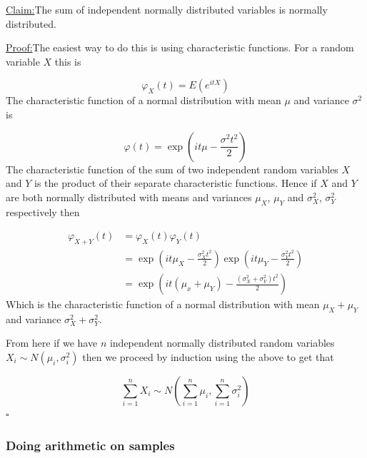 \documentclass[a4paper]{article}
\renewcommand{\qed}{\hfill\ensuremath{\square}}
\newenvironment{claim}[1]{\par\noindent\underline{Claim:}\space#1}{}
\newenvironment{claimproof}[1]{\par\noindent\underline{Proof:}\space#1}{\qed}
\begin{document}
\begin{mdframed}
	\begin{claim}
		The sum of independent normally distributed variables is normally distributed.
	\end{claim}
	\begin{claimproof}
		The easiest way to do this is using characteristic functions. For a random variable \(X\) this is

		\[\varphi_X(t) = E(e^{itX})\]
		The characteristic function of a normal distribution with mean \(\mu\) and variance \(\sigma^2\) is

		\[\varphi(t) = \exp(i t \mu - \frac{\sigma^2 t^2}{2})\]
		The characteristic function of the sum of two independent random variables \(X\) and \(Y\) is the product of their separate characteristic functions. Hence if \(X\) and \(Y\) are both normally distributed with means and variances \(\mu_X\), \(\mu_Y\) and \(\sigma_X^2\), \(\sigma_Y^2\) respectively then

		\begin{align*}
			\varphi_{X+Y}(t)
			& = \varphi_X(t) \varphi_Y(t) \\
			& = \exp\left(i t \mu_X - \frac{\sigma_X^2 t^2}{2}\right) \exp\left(i t \mu_Y - \frac{\sigma_Y^2 t^2}{2}\right) \\
			& = \exp\left(i t (\mu_x + \mu_Y) - \frac{(\sigma_X^2 + \sigma_Y^2) t^2}{2}\right)
		\end{align*}
		Which is the characteristic function of a normal distribution with mean \(\mu_X + \mu_Y\) and variance \(\sigma_X^2 + \sigma_Y^2\).

		From here if we have \(n\) independent normally distributed random variables \(X_i \sim N(\mu_i, \sigma_i^2)\) then we proceed by induction using the above to get that

		\[\sum_{i=1}^n X_i \sim N(\sum_{i=1}^n \mu_i, \sum_{i=1}^n \sigma_i^2)\]
	\end{claimproof}
\end{mdframed}




\subsubsection{Doing arithmetic on samples}
\end{document}
